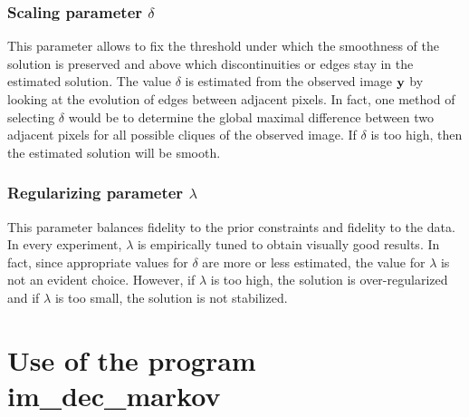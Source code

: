 \subsubsection{Scaling parameter $\delta$}

This parameter allows to fix the threshold under which the smoothness of the
solution is preserved and above which discontinuities or edges stay in the
estimated solution.
The value $\delta$ is estimated from the observed image $\bf y$ by looking at the
evolution of edges between adjacent pixels. In fact, one method of selecting
$\delta$
would be to determine the global maximal difference between two adjacent pixels 
for all possible cliques of the observed image.
If $\delta$ is too high, then the estimated solution will be smooth.

\subsubsection{Regularizing parameter $\lambda$}

This parameter balances fidelity to the prior constraints and fidelity to the
data. In every experiment, $\lambda$ is empirically tuned to obtain 
visually good results. In fact, since appropriate values for $\delta$ are more or
less estimated, the value for $\lambda$ is not an evident choice.
However, if $\lambda$ is too high, the solution is over-regularized and if
$\lambda$ is too small, the solution is not stabilized.

\section{Use of the program im\_dec\_markov}

